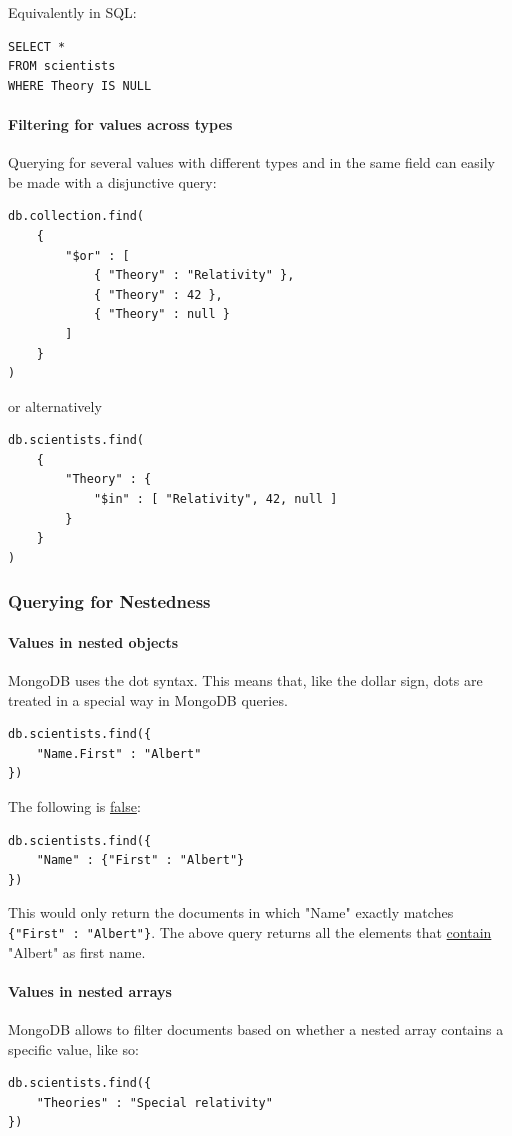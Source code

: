 Equivalently in SQL:
\begin{lstlisting}[style=neutral]
SELECT *
FROM scientists
WHERE Theory IS NULL
\end{lstlisting}

\paragraph{Filtering for values across types}
Querying for several values with different types and in the same field can easily be made with a disjunctive query:
\begin{lstlisting}[style=neutral]
db.collection.find(
    {
        "$or" : [
            { "Theory" : "Relativity" },
            { "Theory" : 42 },
            { "Theory" : null }
        ]
    }
) 
\end{lstlisting}

or alternatively
\begin{lstlisting}[style=neutral]
db.scientists.find(
    {
        "Theory" : {
            "$in" : [ "Relativity", 42, null ]
        }
    }
)
\end{lstlisting}


\subsubsection{Querying for Nestedness}

\paragraph{Values in nested objects}
MongoDB uses the dot syntax. This means that, like the dollar sign, dots are treated in a special way in MongoDB queries.
\begin{lstlisting}[style=neutral]
db.scientists.find({
    "Name.First" : "Albert"
})
\end{lstlisting}
The following is \underline{false}:
\begin{lstlisting}[style=neutral]
db.scientists.find({
    "Name" : {"First" : "Albert"}
})
\end{lstlisting}
This would only return the documents in which "Name" exactly matches \texttt{\{"First" : "Albert"\}}. The above query returns all the elements that \underline{contain} "Albert" as first name.

\paragraph{Values in nested arrays}
MongoDB allows to filter documents based on whether a nested array contains a specific value, like so:
\begin{lstlisting}[style=neutral]
db.scientists.find({
    "Theories" : "Special relativity"
})
\end{lstlisting}


